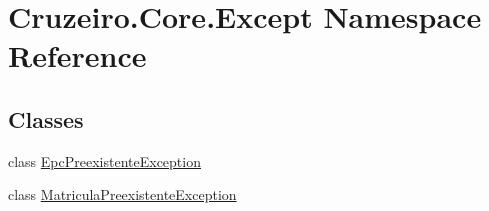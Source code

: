 \hypertarget{namespace_cruzeiro_1_1_core_1_1_except}{}\section{Cruzeiro.\+Core.\+Except Namespace Reference}
\label{namespace_cruzeiro_1_1_core_1_1_except}
\subsection*{Classes}
\begin{DoxyCompactItemize}
\item 
class \hyperlink{class_cruzeiro_1_1_core_1_1_except_1_1_epc_preexistente_exception}{Epc\+Preexistente\+Exception}
\item 
class \hyperlink{class_cruzeiro_1_1_core_1_1_except_1_1_matricula_preexistente_exception}{Matricula\+Preexistente\+Exception}
\end{DoxyCompactItemize}
